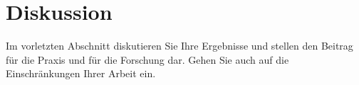 \section{Diskussion}
\label{cha:diskussion}
Im vorletzten Abschnitt diskutieren Sie Ihre Ergebnisse und stellen den Beitrag 
für die Praxis und für die Forschung dar. Gehen Sie auch auf die Einschränkungen 
Ihrer Arbeit ein.